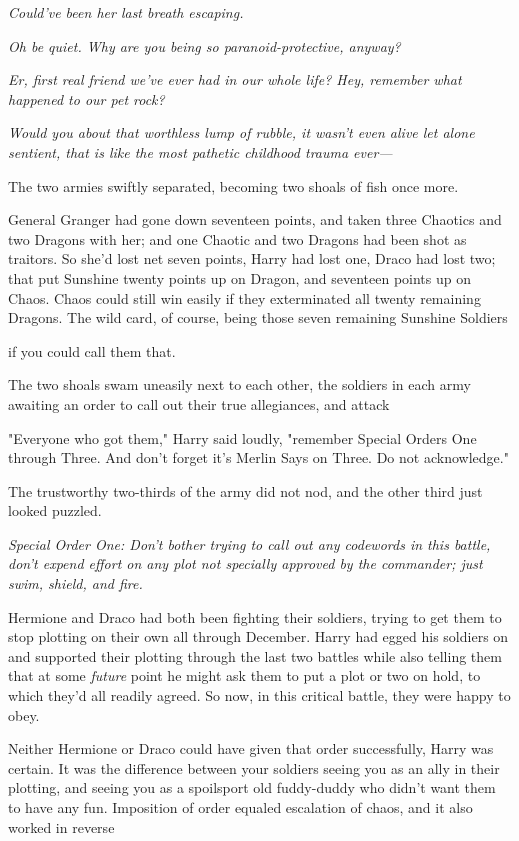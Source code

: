 \emph{Could've been her last breath escaping.}

\emph{Oh be quiet. Why are you being so paranoid-protective, anyway?}

\emph{Er, first real friend we've ever had in our whole life? Hey, remember
what happened to our pet rock?}

\emph{Would you  about that worthless lump of rubble, it wasn't even
alive let alone sentient, that is like the most pathetic childhood trauma
ever---}

The two armies swiftly separated, becoming two shoals of fish once more.

General Granger had gone down seventeen points, and taken three Chaotics and
two Dragons with her; and one Chaotic and two Dragons had been shot as
traitors. So she'd lost net seven points, Harry had lost one, Draco had lost
two; that put Sunshine twenty points up on Dragon, and seventeen points up on
Chaos. Chaos could still win easily if they exterminated all twenty remaining
Dragons. The wild card, of course, being those seven remaining Sunshine
Soldiers{\el}

{\el} if you could call them that.

The two shoals swam uneasily next to each other, the soldiers in each army
awaiting an order to call out their true allegiances, and attack{\el}

"Everyone who got them," Harry said loudly, "remember Special Orders One
through Three. And don't forget it's Merlin Says on Three. Do not acknowledge."

The trustworthy two-thirds of the army did not nod, and the other third just
looked puzzled.

\emph{Special Order One: Don't bother trying to call out any codewords in this
battle, don't expend effort on any plot not specially approved by the
commander; just swim, shield, and fire.}

Hermione and Draco had both been fighting their soldiers, trying to get them to
stop plotting on their own all through December. Harry had egged his soldiers
on and supported their plotting through the last two battles{\el} while also
telling them that at some \emph{future} point he might ask them to put a plot
or two on hold, to which they'd all readily agreed. So now, in this critical
battle, they were happy to obey.

Neither Hermione or Draco could have given that order successfully, Harry was
certain. It was the difference between your soldiers seeing you as an ally in
their plotting, and seeing you as a spoilsport old fuddy-duddy who didn't want
them to have any fun. Imposition of order equaled escalation of chaos, and it
also worked in reverse{\el}

